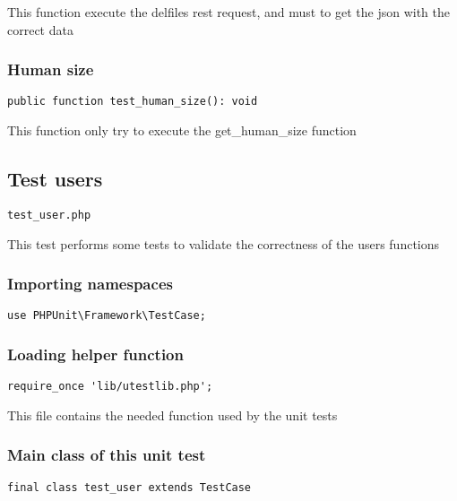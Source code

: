 \documentclass[a4paper]{article}
\begin{document}
This function execute the delfiles rest request, and must to get the
json with the correct data

\hypertarget{toc371}{}
\subsubsection{Human size}

\begin{lstlisting}
public function test_human_size(): void
\end{lstlisting}

This function only try to execute the get\_human\_size function

\hypertarget{toc372}{}
\subsection{Test users}

\begin{lstlisting}
test_user.php
\end{lstlisting}

This test performs some tests to validate the correctness
of the users functions

\hypertarget{toc373}{}
\subsubsection{Importing namespaces}

\begin{lstlisting}
use PHPUnit\Framework\TestCase;
\end{lstlisting}

\hypertarget{toc374}{}
\subsubsection{Loading helper function}

\begin{lstlisting}
require_once 'lib/utestlib.php';
\end{lstlisting}

This file contains the needed function used by the unit tests

\hypertarget{toc375}{}
\subsubsection{Main class of this unit test}

\begin{lstlisting}
final class test_user extends TestCase
\end{lstlisting}
\end{document}
